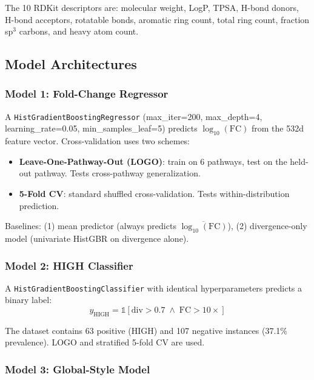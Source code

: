 \documentclass[11pt,a4paper]{article}
\newcommand{\FC}{\text{FC}}
\newcommand{\logFC}{\log_{10}(\FC)}
\begin{document}
\noindent The 10 RDKit descriptors are: molecular weight, LogP, TPSA,
H-bond donors, H-bond acceptors, rotatable bonds, aromatic ring count,
total ring count, fraction sp$^3$ carbons, and heavy atom count.

\subsection{Model Architectures}

\subsubsection{Model 1: Fold-Change Regressor}

A \texttt{HistGradientBoostingRegressor} (max\_iter=200, max\_depth=4,
learning\_rate=0.05, min\_samples\_leaf=5) predicts $\logFC$ from the
532d feature vector. Cross-validation uses two schemes:
\begin{itemize}[nosep]
    \item \textbf{Leave-One-Pathway-Out (LOGO)}: train on 6 pathways,
          test on the held-out pathway. Tests cross-pathway generalization.
    \item \textbf{5-Fold CV}: standard shuffled cross-validation.
          Tests within-distribution prediction.
\end{itemize}

\noindent Baselines: (1) mean predictor (always predicts $\overline{\logFC}$),
(2) divergence-only model (univariate HistGBR on divergence alone).

\subsubsection{Model 2: HIGH Classifier}

A \texttt{HistGradientBoostingClassifier} with identical hyperparameters
predicts a binary label:
\begin{equation}
    y_{\text{HIGH}} = \mathbb{1}[\text{div} > 0.7 \;\wedge\; \FC > 10\times]
\end{equation}

\noindent The dataset contains 63 positive (HIGH) and 107 negative instances
(37.1\% prevalence). LOGO and stratified 5-fold CV are used.

\subsubsection{Model 3: Global-Style Model}
\end{document}
